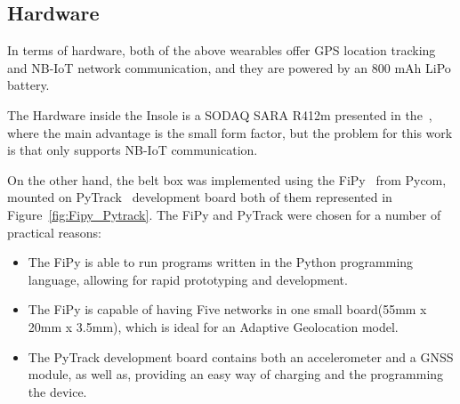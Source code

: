 \subsection{Hardware}
\label{susec:Hardware}

In terms of hardware, both of the above wearables offer GPS location tracking and NB-IoT network communication, and they are powered by an 800 mAh LiPo battery. 

The Hardware inside the Insole is a SODAQ SARA R412m presented in the~, where the main advantage is the small form factor, but the problem for this work is that only supports NB-IoT communication.

On the other hand, the belt box was implemented using the FiPy~\cite{Microcontroller2017,Fipy} from Pycom, mounted on PyTrack~\cite{Pytrack} development board both of them represented in Figure~\ref{fig:Fipy_Pytrack}. The FiPy and PyTrack were chosen for a number of practical reasons:
\begin{itemize}
  \item The FiPy is able to run programs written in the Python programming language, allowing for rapid prototyping and development.
  \item The FiPy is capable of having Five networks in one small board(55mm x 20mm x 3.5mm), which is ideal for an Adaptive Geolocation model.
  \item The PyTrack development board contains both an accelerometer and a GNSS module, as well as, providing an easy way of charging and the programming the device.
\end{itemize}
